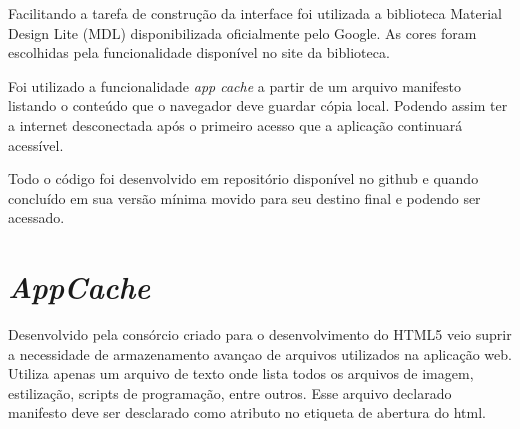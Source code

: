 Facilitando a tarefa de construção da interface foi utilizada a biblioteca Material Design Lite (MDL)\nocite{mdl} disponibilizada oficialmente pelo Google. As cores foram escolhidas pela funcionalidade disponível no site da biblioteca.

Foi utilizado a funcionalidade \textit{app cache} a partir de um arquivo manifesto listando o conteúdo que o navegador deve guardar cópia local. Podendo assim ter a internet desconectada após o primeiro acesso que a aplicação continuará acessível.

Todo o código foi desenvolvido em repositório disponível no github e quando concluído em sua versão mínima movido para seu destino final e podendo ser acessado.\nocite{bizual}\color{black}

\section{\textit{AppCache}}

Desenvolvido pela consórcio criado para o desenvolvimento do HTML5 veio suprir a necessidade de armazenamento avançao de arquivos utilizados na aplicação web. Utiliza apenas um arquivo de texto onde lista todos os arquivos de imagem, estilização, scripts de programação, entre outros. Esse arquivo declarado manifesto deve ser desclarado como atributo no etiqueta de abertura do html.

\ifdraft{}{

%
%
%
%
%
%
%
%
%
}
